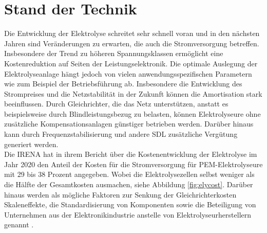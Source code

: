 \section{Stand der Technik}
Die Entwicklung der Elektrolyse schreitet sehr schnell voran und in den nächsten Jahren sind Veränderungen zu erwarten, die auch die Stromversorgung betreffen. Insbesondere der Trend zu höheren Spannungsklassen ermöglicht eine Kostenreduktion auf Seiten der Leistungselektronik. Die optimale Auslegung der Elektrolyseanlage hängt jedoch von vielen anwendungsspezifischen Parametern wie zum Beispiel der Betriebsführung ab. Insbesondere die Entwicklung des Strompreises und die Netzstabilität in der Zukunft können die Amortisation stark beeinflussen. Durch Gleichrichter, die das Netz unterstützen, anstatt es beispielsweise durch Blindleistungsbezug zu belasten, können Elektrolyseure ohne zusätzliche Kompensationsanlagen günstiger betrieben werden. Darüber hinaus kann durch Frequenzstabilisierung und andere \gls{SDL} zusätzliche Vergütung generiert werden. \\
Die \gls{IRENA} hat in ihrem Bericht über die Kostenentwicklung der Elektrolyse im Jahr 2020 den Anteil der Kosten für die Stromversorgung für \gls{PEM}-Elektrolyseure mit 29 bis 38 Prozent angegeben. Wobei die Elektrolysezellen selbst weniger als die Hälfte der Gesamtkosten ausmachen, siehe Abbildung \ref{fig:elycost}. Darüber hinaus werden als mögliche Faktoren zur Senkung der Gleichrichterkosten Skaleneffekte, die Standardisierung von Komponenten sowie die Beteiligung von Unternehmen aus der Elektronikindustrie anstelle von Elektrolyseurherstellern genannt \cite{IRENA2020}. 
